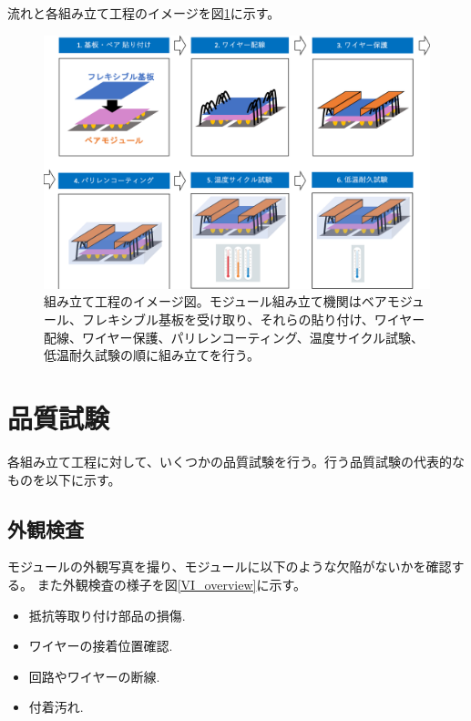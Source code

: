 流れと各組み立て工程のイメージを図\ref{assembly_flow}に示す。
\begin{figure}[bpt]\centering
\includegraphics[width=12cm]{./assembly_flow.png}
\caption[組み立て工程のイメージ図]{組み立て工程のイメージ図。モジュール組み立て機関はベアモジュール、フレキシブル基板を受け取り、それらの貼り付け、ワイヤー配線、ワイヤー保護、パリレンコーティング、温度サイクル試験、低温耐久試験の順に組み立てを行う。}
\label{assembly_flow}
\end{figure}

\section{品質試験}
各組み立て工程に対して、いくつかの品質試験を行う。行う品質試験の代表的なものを以下に示す。

\subsection{外観検査}
モジュールの外観写真を撮り、モジュールに以下のような欠陥がないかを確認する。
また外観検査の様子を図\ref{VI_overview}に示す。
\begin{itemize}
  \item 抵抗等取り付け部品の損傷.
  \item ワイヤーの接着位置確認.
  \item 回路やワイヤーの断線.
  \item 付着汚れ.
\end{itemize}

